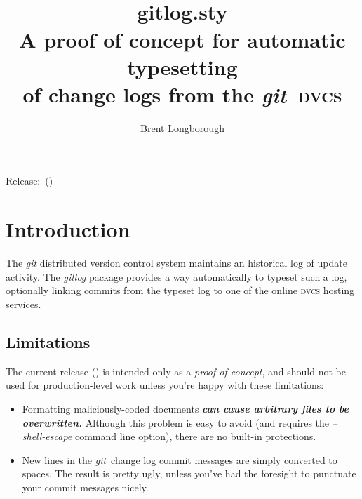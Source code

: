 \documentclass[a4paper,12pt,twoside,openany]{memoir}
\newcommand{\sfit}[1]{\textit{#1}}
\newcommand{\git}{\sfit{git}}
\newcommand{\tpname}{\sfit{gitlog}}
\newcommand{\tpfname}{\textsf{gitlog.sty}}
\begin{document}
\frontmatter
\title{%
	~\\[2\baselineskip]
	\Huge \tpfname\\[2ex]%
	\Large A proof of concept for automatic typesetting \\of change logs from the \git\ \textsc{dvcs}
	}
  \author{Brent Longborough}
\date{ }
\maketitle

{\centering
Release:\gitRels\ (\gitAbbrevHash)\\
}
\thispagestyle{empty}
\clearforchapter
\tableofcontents*
\mainmatter
\pagestyle{giruled}
\chapter{Introduction}
The \git{} distributed version control system
maintains an historical log of update activity.
The \tpname{} package provides a way automatically 
to typeset such a log, optionally linking commits 
from the typeset log
to one of the online \textsc{dvcs} hosting services.

\section{Limitations}

The current release (\gitRel) 
is intended only as a \emph{proof-of-concept}, 
and should not be used for production-level work
unless you're happy with these limitations:
\begin{itemize}
\item Formatting maliciously-coded documents 
\textbf{\emph{can cause arbitrary files to be overwritten.}} 
Although this problem is easy to avoid 
(and requires the \sfit{--shell-escape} command line option),
there are no built-in protections.
\item New lines in the \git\ change log commit messages are 
simply converted to spaces. 
The result is pretty ugly, 
unless you've had the foresight 
to punctuate your commit messages nicely.
\end{itemize}
\end{document}
